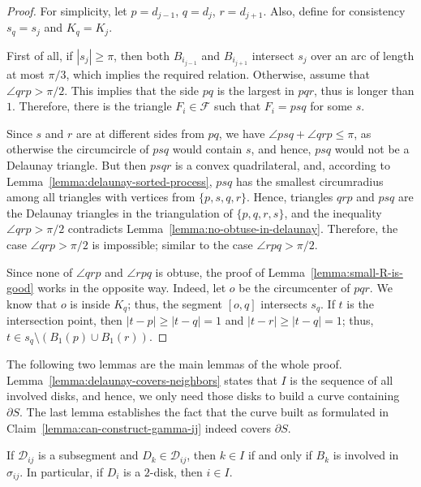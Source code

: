 \begin{appendices}
\begin{proof}
For simplicity, let $p = d_{j-1}$, $q = d_j$, $r = d_{j+1}$. Also, define for consistency $s_q = s_j$ and $K_q = K_j$.

First of all, if $|s_j|\geq\pi$, then both $B_{i_{j-1}}$ and $B_{i_{j+1}}$ intersect $s_j$ over an arc of length at most $\pi/3$, which implies the required relation. Otherwise, assume that $\angle qrp > \pi/2$. This implies that the side $pq$ is the largest in $pqr$, thus is longer than $1$. Therefore, there is the triangle $F_i\in\mathcal{F}$ such that $F_i = psq$ for some $s$.

Since $s$ and $r$ are at different sides from $pq$, we have $\angle psq + \angle qrp\leq\pi$, as otherwise the circumcircle of $psq$ would contain $s$, and hence, $psq$ would not be a Delaunay triangle. But then $psqr$ is a convex quadrilateral, and, according to Lemma~\ref{lemma:delaunay-sorted-process}, $psq$ has the smallest circumradius among all triangles with vertices from $\{p, s, q, r\}$. Hence, triangles $qrp$ and $psq$ are the Delaunay triangles in the triangulation of $\{p, q, r, s\}$, and the inequality $\angle qrp > \pi/2$ contradicts Lemma~\ref{lemma:no-obtuse-in-delaunay}. Therefore, the case $\angle qrp > \pi/2$ is impossible; similar to the case $\angle rpq > \pi/2$.

Since none of $\angle qrp$ and $\angle rpq$ is obtuse,
the proof of Lemma~\ref{lemma:small-R-is-good} works in the opposite way.
Indeed, let $o$ be the circumcenter of $pqr$. We know that $o$ is inside $K_q$; thus, the segment $[o, q]$ intersects $s_q$. If $t$ is the intersection point, then $|t - p|\geq |t - q| = 1$ and $|t - r|\geq |t - q| = 1$; thus, $t\in s_q\setminus(B_1(p)\cup B_1(r))$.
\end{proof}

The following two lemmas are the main lemmas of the whole proof. Lemma~\ref{lemma:delaunay-covers-neighbors} states that $I$ is the sequence of all involved disks, and hence, we only need those disks to build a curve containing $\partial S$. The last lemma establishes the fact that the curve built as formulated in Claim~\ref{lemma:can-construct-gamma-ij} indeed covers $\partial S$.

\begin{lemma}\label{lemma:delaunay-covers-neighbors}
If $\mathcal{D}_{ij}$ is a subsegment and $D_k\in\mathcal{D}_{ij}$, then $k\in I$ if and only if $B_k$ is involved in $\sigma_{ij}$. In particular, if $D_i$ is a $2$-disk, then $i\in I$.
\end{lemma}


\end{appendices}
